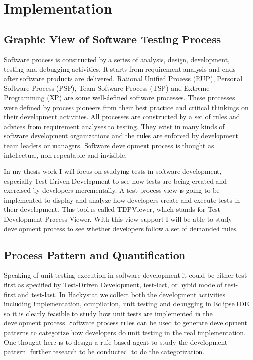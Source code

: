 \chapter{Implementation}
\label{chap:Implementation}

\section{Graphic View of Software Testing Process}
Software process is constructed by a series of analysis, design,
development, testing and debugging activities. It starts from requirement
analysis and ends after software products are delivered. Rational Unified
Process (RUP), Personal Software Process (PSP), Team Software Process (TSP)
and Extreme Programming (XP) are some well-defined software processes.
These processes were defined by process pioneers from their best practice
and critical thinkings on their development activities. All processes are
constructed by a set of rules and advices from requirement analyses to
testing. They exist in many kinds of software development organizations and
the rules are enforced by development team leaders or managers. Software
development process is thought as intellectual, non-repeatable and invisible.

In my thesis work I will focus on studying tests in software development,
especially Test-Driven Development to see how tests are being created and
exercised by developers incrementally. A test process view is going to be
implemented to display and analyze how developers create and execute tests
in their development. This tool is called TDPViewer, which stands for Test
Development Process Viewer. With this view support I will be able to
study development process to see whether developers follow a set of
demanded rules.
\section{Process Pattern and Quantification}
Speaking of unit testing execution in software development it could be
either test-first as specified by Test-Driven Development, test-last, or
hybid mode of test-first and test-last. In Hackystat we collect both the
development activities including implementation, compilation, unit testing
and debugging in Eclipse IDE so it is clearly feasible to study how unit
tests are implemented in the development process. Software process rules
can be used to generate development patterns to categorize how developers
do unit testing in the real implementation. One thought here is to design a
rule-based agent to study the development pattern [further research to be
conducted] to do the categorization.





















